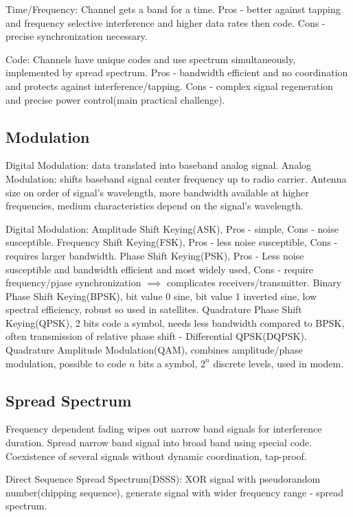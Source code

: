 \documentclass[9pt]{extarticle}
\begin{document}
\begin{multicols}{2}
Time/Frequency: Channel gets a band for a time. Pros - better against tapping and frequency selective interference and higher data rates then code. Cons - precise synchronization necessary.

Code: Channels have unique codes and use spectrum simultaneously, implemented by spread spectrum. Pros - bandwidth efficient and no coordination and protects against interference/tapping. Cons - complex signal regeneration and precise power control(main practical challenge).

\subsection{Modulation}

Digital Modulation: data translated into baseband analog signal. Analog Modulation: shifts baseband signal center frequency up to radio carrier. Antenna size on order of signal’s wavelength, more bandwidth available at higher frequencies, medium characteristics depend on the
signal’s wavelength. 

Digital Modulation: Amplitude Shift Keying(ASK), Pros - simple, Cons - noise susceptible. Frequency Shift Keying(FSK), Pros - less noise susceptible, Cons - requires larger bandwidth. Phase Shift Keying(PSK), Pros - Less noise susceptible and bandwidth efficient and most widely used, Cons - require frequency/pjase synchronization $\implies$ complicates receivers/transmitter. Binary Phase Shift Keying(BPSK), bit value 0 sine, bit value 1 inverted sine, low spectral efficiency, robust so used in satellites. Quadrature Phase Shift Keying(QPSK), 2 bits code a symbol, needs less bandwidth compared to BPSK, often transmission of relative phase shift - Differential QPSK(DQPSK). Quadrature Amplitude Modulation(QAM), combines amplitude/phase modulation, possible to code $n$ bits a symbol, $2^n$ discrete levels, used in modem.

\subsection{Spread Spectrum}

Frequency dependent fading wipes out narrow band signals
for interference duration. Spread narrow band signal into broad band using special code. Coexistence of several signals without dynamic coordination, tap-proof.

Direct Sequence Spread Spectrum(DSSS): XOR signal with pseudorandom number(chipping sequence), generate signal with wider frequency range - spread spectrum.


\end{multicols}
\end{document}
